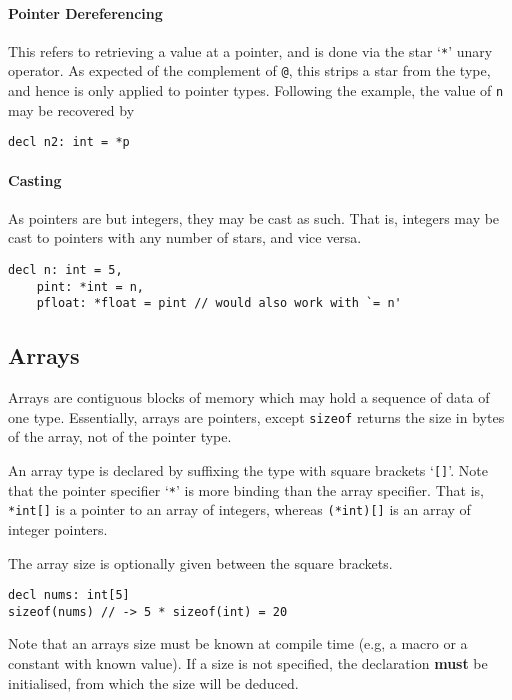 \documentclass{article}
\begin{document}
\paragraph*{Pointer Dereferencing}
This refers to retrieving a value at a pointer, and is done via the star `\texttt{*}' unary operator.
As expected of the complement of \texttt{@}, this strips a star from the type, and hence is only applied to pointer types.
Following the example, the value of \texttt{n} may be recovered by

\begin{lstlisting}[language=CustomLang]
decl n2: int = *p
\end{lstlisting}

\paragraph*{Casting}
As pointers are but integers, they may be cast as such.
That is, integers may be cast to pointers with any number of stars, and vice versa.

\begin{lstlisting}[language=CustomLang]
decl n: int = 5,
    pint: *int = n,
    pfloat: *float = pint // would also work with `= n'
\end{lstlisting}

\subsection{Arrays}

Arrays are contiguous blocks of memory which may hold a sequence of data of one type.
Essentially, arrays are pointers, except \texttt{sizeof} returns the size in bytes of the array, not of the pointer type.

An array type is declared by suffixing the type with square brackets `\texttt{[]}'.
Note that the pointer specifier `\texttt{*}' is more binding than the array specifier.
That is, \texttt{*int[]} is a pointer to an array of integers, whereas \texttt{(*int)[]} is an array of integer pointers.

The array size is optionally given between the square brackets.

\begin{lstlisting}[language=CustomLang]
decl nums: int[5]
sizeof(nums) // -> 5 * sizeof(int) = 20
\end{lstlisting}

Note that an arrays size must be known at compile time (e.g, a macro or a constant with known value).
If a size is not specified, the declaration \textbf{must} be initialised, from which the size will be deduced.
\end{document}
